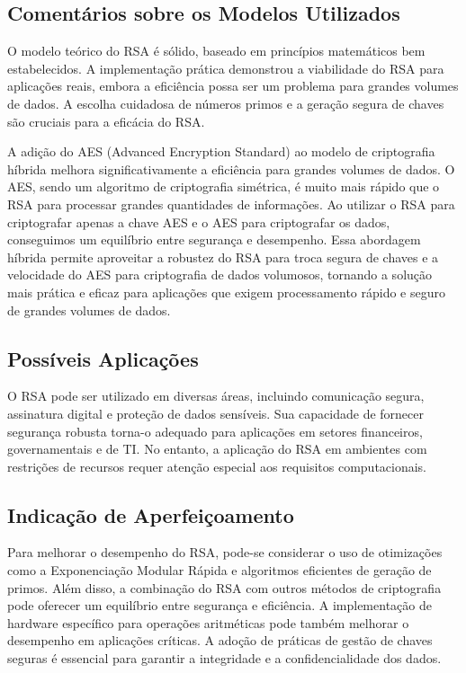 \documentclass[a4paper,12pt]{article}
\begin{document}
\subsection*{Comentários sobre os Modelos Utilizados}
O modelo teórico do RSA é sólido, baseado em princípios matemáticos bem estabelecidos. A implementação prática demonstrou a viabilidade do RSA para aplicações reais, embora a eficiência possa ser um problema para grandes volumes de dados. A escolha cuidadosa de números primos e a geração segura de chaves são cruciais para a eficácia do RSA.

A adição do AES (Advanced Encryption Standard) ao modelo de criptografia híbrida melhora significativamente a eficiência para grandes volumes de dados. O AES, sendo um algoritmo de criptografia simétrica, é muito mais rápido que o RSA para processar grandes quantidades de informações. Ao utilizar o RSA para criptografar apenas a chave AES e o AES para criptografar os dados, conseguimos um equilíbrio entre segurança e desempenho. Essa abordagem híbrida permite aproveitar a robustez do RSA para troca segura de chaves e a velocidade do AES para criptografia de dados volumosos, tornando a solução mais prática e eficaz para aplicações que exigem processamento rápido e seguro de grandes volumes de dados.

\subsection*{Possíveis Aplicações}
O RSA pode ser utilizado em diversas áreas, incluindo comunicação segura, assinatura digital e proteção de dados sensíveis. Sua capacidade de fornecer segurança robusta torna-o adequado para aplicações em setores financeiros, governamentais e de TI. No entanto, a aplicação do RSA em ambientes com restrições de recursos requer atenção especial aos requisitos computacionais.

\subsection*{Indicação de Aperfeiçoamento}
Para melhorar o desempenho do RSA, pode-se considerar o uso de otimizações como a Exponenciação Modular Rápida e algoritmos eficientes de geração de primos. Além disso, a combinação do RSA com outros métodos de criptografia pode oferecer um equilíbrio entre segurança e eficiência. A implementação de hardware específico para operações aritméticas pode também melhorar o desempenho em aplicações críticas. A adoção de práticas de gestão de chaves seguras é essencial para garantir a integridade e a confidencialidade dos dados.
\end{document}
